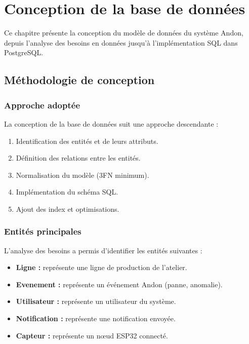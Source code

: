 \chapter{Conception de la base de donn\'ees}

Ce chapitre pr\'esente la conception du mod\`ele de donn\'ees du syst\`eme Andon, depuis l'analyse des besoins en donn\'ees jusqu'\`a l'impl\'ementation SQL dans PostgreSQL.

\section{M\'ethodologie de conception}

\subsection{Approche adopt\'ee}

La conception de la base de donn\'ees suit une approche descendante :

\begin{enumerate}
    \item Identification des entit\'es et de leurs attributs.
    \item D\'efinition des relations entre les entit\'es.
    \item Normalisation du mod\`ele (3FN minimum).
    \item Impl\'ementation du sch\'ema SQL.
    \item Ajout des index et optimisations.
\end{enumerate}

\subsection{Entit\'es principales}

L'analyse des besoins a permis d'identifier les entit\'es suivantes :

\begin{itemize}
    \item \textbf{Ligne :} repr\'esente une ligne de production de l'atelier.
    \item \textbf{Evenement :} repr\'esente un \'ev\'enement Andon (panne, anomalie).
    \item \textbf{Utilisateur :} repr\'esente un utilisateur du syst\`eme.
    \item \textbf{Notification :} repr\'esente une notification envoy\'ee.
    \item \textbf{Capteur :} repr\'esente un n\oe{}ud ESP32 connect\'e.
\end{itemize}

